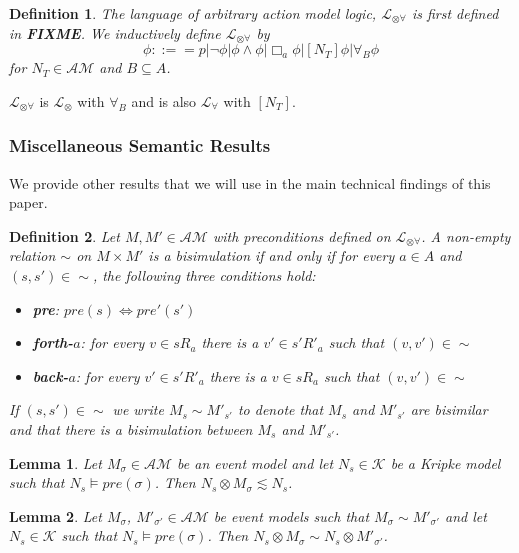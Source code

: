 \documentclass[12pt, a4paper, titlepage]{article}
\newtheorem{defn}{Definition}[subsection]
\newtheorem{lemma}{Lemma}[subsection]
\numberwithin{equation}{section}
\newcommand{\sqex}[1]{[{#1}]}
\newcommand{\lang}{\mathcal{L}}
\newcommand{\langRefine}{\lang_{\forall}}
\newcommand{\langActEx}{\lang_{\otimes}}
\newcommand{\langArbAct}{\lang_{\otimes\forall}}
\newcommand{\kripkeClass}{\mathcal{K}}
\newcommand{\eventClass}{\mathcal{AM}}
\newcommand{\FIXME}{{\bf FIXME}}
\begin{document}

\begin{defn} \label{arbActLogic}
The language of arbitrary action model logic, $\langArbAct$ is first defined in \FIXME.
We inductively define $\langArbAct$ by
\[
	\phi ::== p | \neg \phi | \phi \land \phi | \Box_a \phi | \sqex{N_T} \phi | \forall_B \phi
\]
for $N_T \in \eventClass$ and $B \subseteq A$.
\end{defn}
$\langArbAct$ is $\langActEx$ with $\forall_B$ and is also $\langRefine$ with $\sqex{N_T}$.



\subsubsection{Miscellaneous Semantic Results}
We provide other results that we will use in the main technical findings of this paper.

\begin{defn} \label{bisimEvent}
	Let $M, M' \in \eventClass$ with preconditions defined on $\langArbAct$.
	A non-empty relation $\sim$ on $M \times M'$ is a bisimulation if and only if for every $a \in A$
	and $(s, s') \in \sim$, the following three conditions hold:
	\begin{itemize}
		\item {\bf pre}: $pre(s) \iff pre'(s')$
		\item {\bf forth-$a$}: for every $v \in s R_a$ there is a $v' \in s' R'_a$ such that $(v,v') \in
		\sim$
		\item {\bf back-$a$}: for every $v' \in s' R'_a$ there is a $v \in s R_a$ such that $(v,v') \in
		\sim$
	\end{itemize}
	If $(s, s') \in \sim$ we write $M_s \sim M'_{s'}$ to denote that $M_s$ and $M'_{s'}$ are bisimilar and
	that there is a bisimulation between $M_s$ and $M'_{s'}$.
\end{defn}

\begin{lemma} \label{eventModelsRefine}
Let $M_\sigma \in \eventClass$ be an event model and let $N_s \in \kripkeClass$ be a Kripke
model such that $N_s \models pre(\sigma)$.
Then $N_s \otimes M_\sigma \lesssim N_s$.
\end{lemma}

\begin{lemma} \label{eventModelEquivalent}
Let $M_\sigma$, $M'_{\sigma'} \in \eventClass$ be event models such that $M_\sigma \sim M'_{\sigma'}$
and let $N_s \in \kripkeClass$ such that $N_s \models pre(\sigma)$.
Then $N_s \otimes M_\sigma \sim N_s \otimes M'_{\sigma'}$.
\end{lemma}
\end{document}
